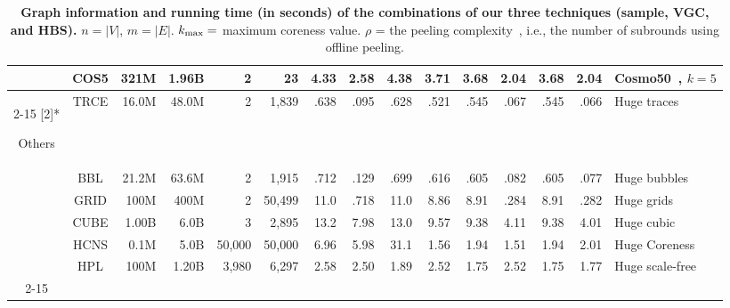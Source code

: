 \begin{table*}[htbp]
\begin{tabular}{ccrrrr|rrrrrrrr|l}
          & COS5  & 321M  & 1.96B & 2     & 23    & 4.33  & 2.58  & 4.38  & 3.71  & 3.68  & 2.04  & 3.68  & 2.04  & Cosmo50~\cite{cosmo50,wang2021geograph}, $k=5$ \\
\cmidrule{2-15}    \multirow{6}[2]{*}{\begin{sideways}Others\end{sideways}} & TRCE  & 16.0M & 48.0M & 2     & 1,839 & .638  & .095  & .628  & .521  & .545  & .067  & .545  & .066  & Huge traces~\cite{nr} \\
          & BBL   & 21.2M & 63.6M & 2     & 1,915 & .712  & .129  & .699  & .616  & .605  & .082  & .605  & .077  & Huge bubbles~\cite{nr} \\
          & GRID  & 100M  & 400M  & 2     & 50,499 & 11.0  & .718  & 11.0  & 8.86  & 8.91  & .284  & 8.91  & .282  & Huge grids \\
          & CUBE  & 1.00B & 6.0B  & 3     & 2,895 & 13.2  & 7.98  & 13.0  & 9.57  & 9.38  & 4.11  & 9.38  & 4.01  & Huge cubic \\
          & HCNS  & 0.1M  & 5.0B  & 50,000 & 50,000 & 6.96  & 5.98  & 31.1  & 1.56  & 1.94  & 1.51  & 1.94  & 2.01  & Huge Coreness \\
          & HPL   & 100M  & 1.20B & 3,980 & 6,297 & 2.58  & 2.50  & 1.89  & 2.52  & 1.75  & 2.52  & 1.75  & 1.77  & Huge scale-free \\
\cmidrule{2-15}    \end{tabular}%

  \caption{\textbf{Graph information and running time (in seconds) of the combinations of our three techniques (sample, VGC, and HBS).} 
  \textnormal{
    $n= |V|$, $m= |E|$.
    ${k_{\max}}=$ maximum coreness value. 
    $\rho$ = the peeling complexity~\cite{dhulipala2017}, i.e., the number of subrounds using offline peeling. 
    }
      \label{table:combinations}
      }
    
    \end{table*}%
